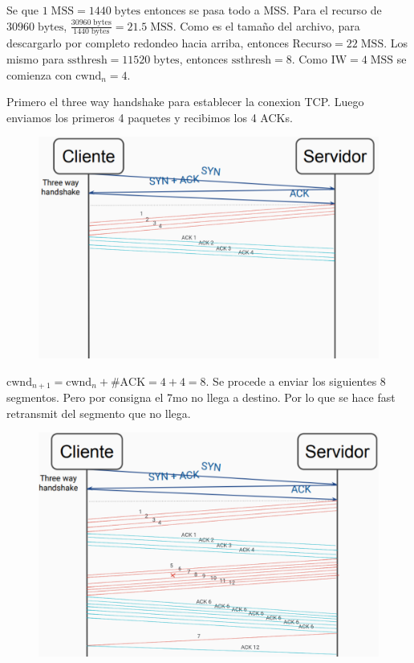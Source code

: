 \documentclass[titlepage,a4paper]{article}
\begin{document}
Se que $ 1 \; \mathrm{MSS} = 1440 \; \mathrm{bytes} $ entonces se pasa todo a MSS. Para el recurso de $ 30960 \; \mathrm{bytes} $, $ \frac{30960 \; \mathrm{bytes} }{1440 \; \mathrm{bytes}} = 21.5 \; \mathrm{MSS}$. Como es el tamaño del archivo, para descargarlo por completo redondeo hacia arriba, entonces $ \mathrm{Recurso} = 22 \; \mathrm{MSS} $. Los mismo para $\mathrm{ssthresh}= 11520 \;\mathrm{bytes}$, entonces $\mathrm{ssthresh}= 8$. 
Como $\mathrm{IW} = 4 \; \mathrm{MSS}$ se comienza con $ \mathrm{cwnd}_n = 4$.



Primero el three way handshake para establecer la conexion TCP. Luego enviamos los primeros 4 paquetes y recibimos los 4 ACKs.


\begin{figure}[H]
\centering
\includegraphics[width=\textwidth]{imagenes/resEj11.png}
\end{figure}

$ \mathrm{cwnd}_{n+1} = \mathrm{cwnd}_{n} + \#\mathrm{ACK} = 4 + 4 = 8 $. Se procede a enviar los siguientes 8 segmentos. Pero por consigna el 7mo no llega a destino. Por lo que se hace fast retransmit del segmento que no llega.

\begin{figure}[H]
\centering
\includegraphics[width=\textwidth]{imagenes/resEj12.png}
\end{figure}
\end{document}
